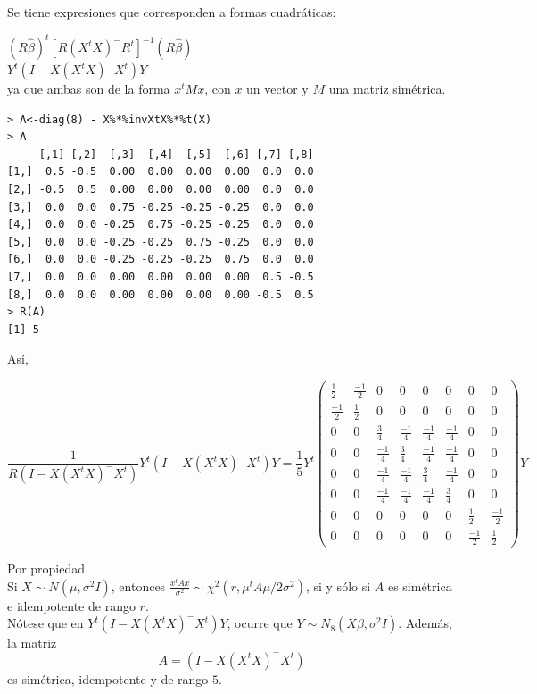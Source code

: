 \documentclass[12pt,a4paper]{report}
\begin{document}
\begin{itemize}
\begin{enumerate}
Se tiene expresiones que corresponden a formas cuadráticas:

$(R\widehat{\beta})^t[R(X^tX)^{-}R^t]^{-1}(R\widehat{\beta})$\\

$Y^t(I - X(X^tX)^{-}X^t)Y $\\

ya que ambas son de la forma $x^tMx$, con $x$ un vector y $M$ una matriz simétrica.


\begin{verbatim}
> A<-diag(8) - X%*%invXtX%*%t(X)
> A
     [,1] [,2]  [,3]  [,4]  [,5]  [,6] [,7] [,8]
[1,]  0.5 -0.5  0.00  0.00  0.00  0.00  0.0  0.0
[2,] -0.5  0.5  0.00  0.00  0.00  0.00  0.0  0.0
[3,]  0.0  0.0  0.75 -0.25 -0.25 -0.25  0.0  0.0
[4,]  0.0  0.0 -0.25  0.75 -0.25 -0.25  0.0  0.0
[5,]  0.0  0.0 -0.25 -0.25  0.75 -0.25  0.0  0.0
[6,]  0.0  0.0 -0.25 -0.25 -0.25  0.75  0.0  0.0
[7,]  0.0  0.0  0.00  0.00  0.00  0.00  0.5 -0.5
[8,]  0.0  0.0  0.00  0.00  0.00  0.00 -0.5  0.5
> R(A)
[1] 5
\end{verbatim}

Así,

\[\frac{1}{R(I - X(X^tX)^{-}X^t)}Y^t(I - X(X^tX)^{-}X^t)Y = \frac{1}{5} Y^t\begin{pmatrix}
\frac{1}{2} & \frac{-1}{2} & 0 & 0 & 0 & 0 & 0 & 0 \\
\frac{-1}{2} & \frac{1}{2} & 0 & 0 & 0 & 0 & 0 & 0 \\
0 & 0 & \frac{3}{4} & \frac{-1}{4} & \frac{-1}{4} & \frac{-1}{4} & 0 & 0 \\
0 & 0 & \frac{-1}{4} & \frac{3}{4} & \frac{-1}{4} & \frac{-1}{4} & 0 & 0 \\
0 & 0 & \frac{-1}{4} & \frac{-1}{4} & \frac{3}{4} & \frac{-1}{4} & 0 & 0 \\
0 & 0 & \frac{-1}{4} & \frac{-1}{4} & \frac{-1}{4} & \frac{3}{4} & 0 & 0 \\
0 & 0 & 0 & 0 & 0 & 0 & \frac{1}{2} & \frac{-1}{2} \\
0 & 0 & 0 & 0 & 0 & 0 & \frac{-1}{2} & \frac{1}{2}
\end{pmatrix}Y\]

Por propiedad\\
 Si $X \sim N(\mu, \sigma^2I)$, entonces $\frac{x^tAx}{\sigma^2} \sim \chi^2(r, \mu^tA\mu/2\sigma^2)$, si y sólo si $A$ es simétrica e idempotente de rango $r$.\\

Nótese que en $Y^t(I - X(X^tX)^{-}X^t)Y$, ocurre que $Y \sim N_8(X\beta, \sigma^2I)$. Además, la matriz
\[A=(I - X(X^tX)^{-}X^t)\] es simétrica, idempotente y de rango $5$.


\end{enumerate}
\end{itemize}
\end{document}
